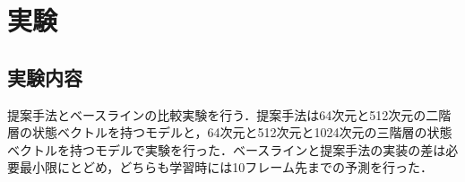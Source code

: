 \documentclass[10pt, twocolumn]{jarticle}
\begin{document}

\section{実験}
\label{chap:experiment}


\subsection{実験内容}

提案手法とベースラインの比較実験を行う．提案手法は64次元と512次元の二階層の状態ベクトルを持つモデルと，64次元と512次元と1024次元の三階層の状態ベクトルを持つモデルで実験を行った．ベースラインと提案手法の実装の差は必要最小限にとどめ，どちらも学習時には10フレーム先までの予測を行った．



\end{document}
